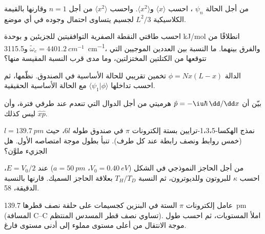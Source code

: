 \begin{exercise}[$\star\star$]\label{exo:b3:quantum-model-systems:5}
من أجل الحالة $\psi_n$ ، احسب $\langle x\rangle$ 
و$\langle x^2\rangle$. واحسب $\langle x^2\rangle$ من أجل $n = 1$ وقارنها
بالقيمة الكلاسيكية $L^2/3$ لجسيم يتساوى احتمال وجوده في أي موضع.
\end{exercise}

\begin{exercise}[$\star\star$]\label{exo:b3:quantum-model-systems:6}
احسب طاقتي النقطة الصفرية التوافقيتين للجزيئين  و بوحدة
\unit{kJ/mol} انطلاقًا من $\tilde\omega_e = \qty{4401.2}{cm^{-1}}$ 
و\qty{3115.5}{cm^{-1}}، والفرق بينهما. ما النسبة بين العددين الموجيين التي
تتوقعها من الكتلتين المختزلتين، وما مدى قرب النسبة المقيسة منها؟
\end{exercise}

\begin{exercise}[$\star\star$]\label{exo:b3:quantum-model-systems:7}
الدالة $\phi = Nx(L - x)$ تخمين تقريبي للحالة الأساسية في
الصندوق. نظّمها، ثم احسب تداخلها $\langle\psi_1|\phi\rangle$ مع
الحالة الأساسية الحقيقية.
\end{exercise}

\begin{exercise}[$\star\star$]\label{exo:b3:quantum-model-systems:8}
بيّن أن $\hat p = -\iu\hbar\,\dd/\dd x$ هرميتي من أجل الدوال التي
تنعدم عند طرفي فترة، وأن $\hat x\hat p$ ليس كذلك.
\end{exercise}

\begin{exercise}[$\star\star$]\label{exo:b3:quantum-model-systems:9}
نمذج الهكسا-1،3،5-ترايين بستة إلكترونات $\pi$ في صندوق طوله $6l$، حيث $l =
\qty{139.7}{pm}$ (خمس روابط ونصف رابطة عند كل طرف). تنبأ
بطول موجة امتصاصه الأول. هل الجزيء ملوَّن؟
\end{exercise}

\begin{exercise}[$\star\star\star$]\label{exo:b3:quantum-model-systems:10}
من أجل الحاجز النموذجي في الشكل ($V_0 = \qty{0.40}{eV}$، $a = \qty{50}{pm}$)
عند $E = V_0/2$، احسب $\kappa$ للبروتون وللديوترون، ثم النسبة $T_H/T_D$
بعلاقة الحاجز السميك. قارنها بالنسبة الدقيقة، 58.
\end{exercise}

\begin{exercise}[$\star\star\star$]\label{exo:b3:quantum-model-systems:11}
عامل إلكترونات $\pi$ الستة في البنزين كجسيمات على حلقة نصف قطرها
\qty{139.7}{pm} (المسافة C--C تساوي نصف قطر المسدس المنتظم).
املأ المستويات، ثم احسب طول موجة الانتقال من
أعلى مستوى مملوء إلى أدنى مستوى فارغ.
\end{exercise}

